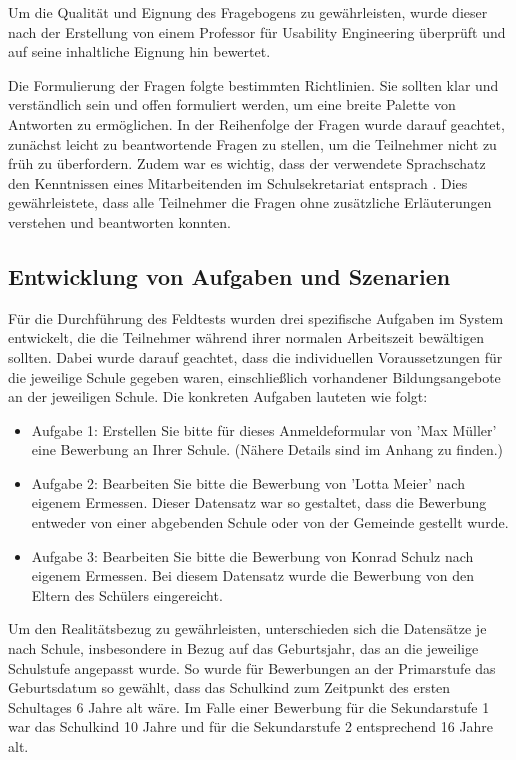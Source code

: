 Um die Qualität und Eignung des Fragebogens zu gewährleisten, wurde dieser nach der Erstellung von einem Professor für Usability Engineering überprüft und auf seine inhaltliche Eignung hin bewertet.

Die Formulierung der Fragen folgte bestimmten Richtlinien. Sie sollten klar und verständlich sein und offen formuliert werden, um eine breite Palette von Antworten zu ermöglichen. In der Reihenfolge der Fragen wurde darauf geachtet, zunächst leicht zu beantwortende Fragen zu stellen, um die Teilnehmer nicht zu früh zu überfordern. Zudem war es wichtig, dass der verwendete Sprachschatz den Kenntnissen eines Mitarbeitenden im Schulsekretariat entsprach \cite{Kruse_2015}. Dies gewährleistete, dass alle Teilnehmer die Fragen ohne zusätzliche Erläuterungen verstehen und beantworten konnten.

\subsection{Entwicklung von Aufgaben und Szenarien}

Für die Durchführung des Feldtests wurden drei spezifische Aufgaben im System entwickelt, die die Teilnehmer während ihrer normalen Arbeitszeit bewältigen sollten. Dabei wurde darauf geachtet, dass die individuellen  Voraussetzungen für die jeweilige Schule gegeben waren, einschließlich  vorhandener Bildungsangebote an der jeweiligen Schule. Die konkreten Aufgaben lauteten wie folgt:

\begin{itemize}
\item Aufgabe 1: \glqq Erstellen Sie bitte für dieses Anmeldeformular von 'Max Müller' eine Bewerbung an Ihrer Schule.\grqq{}  (Nähere Details sind im Anhang zu finden.)
\item Aufgabe 2: \glqq Bearbeiten Sie bitte die Bewerbung von 'Lotta Meier' nach eigenem Ermessen.\grqq{}  Dieser Datensatz war so gestaltet, dass die Bewerbung entweder von einer abgebenden Schule oder von der Gemeinde gestellt wurde.
\item Aufgabe 3: \glqq Bearbeiten Sie bitte die Bewerbung von Konrad Schulz nach eigenem Ermessen.\grqq{}  Bei diesem Datensatz wurde die Bewerbung von den Eltern des Schülers eingereicht.
\end{itemize}

Um den Realitätsbezug zu gewährleisten, unterschieden sich die Datensätze je nach Schule, insbesondere in Bezug auf das Geburtsjahr, das an die jeweilige Schulstufe angepasst wurde. So wurde für Bewerbungen an der Primarstufe das Geburtsdatum so gewählt, dass das Schulkind zum Zeitpunkt des ersten Schultages 6 Jahre alt wäre. Im Falle einer Bewerbung für die Sekundarstufe 1 war das Schulkind 10 Jahre und für die Sekundarstufe 2 entsprechend 16 Jahre alt.

